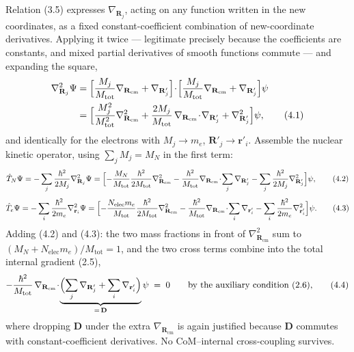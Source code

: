 \documentclass{article}
\begin{document}
Relation (3.5) expresses $\nabla_{\mathbf{R}_j}$, acting on any function written in the new coordinates, as a fixed constant-coefficient combination of new-coordinate derivatives. Applying it twice --- legitimate precisely because the coefficients are constants, and mixed partial derivatives of smooth functions commute --- and expanding the square,
\begin{align}
\nabla^2_{\mathbf{R}_j}\Psi
&=\Bigl[\frac{M_j}{M_{\mathrm{tot}}}\nabla_{\mathbf{R}_{\mathrm{cm}}}+\nabla_{\mathbf{R}'_j}\Bigr]\!\cdot\!\Bigl[\frac{M_j}{M_{\mathrm{tot}}}\nabla_{\mathbf{R}_{\mathrm{cm}}}+\nabla_{\mathbf{R}'_j}\Bigr]\psi \nonumber\\
&=\Bigl[\frac{M_j^2}{M_{\mathrm{tot}}^2}\nabla^2_{\mathbf{R}_{\mathrm{cm}}}
+\frac{2M_j}{M_{\mathrm{tot}}}\,\nabla_{\mathbf{R}_{\mathrm{cm}}}\!\cdot\!\nabla_{\mathbf{R}'_j}
+\nabla^2_{\mathbf{R}'_j}\Bigr]\psi , \tag{4.1}
\end{align}
and identically for the electrons with $M_j\to m_e$, $\mathbf{R}'_j\to\mathbf{r}'_i$. Assemble the nuclear kinetic operator, using $\sum_j M_j=M_N$ in the first term:
\begin{equation}
\hat T_N\Psi=-\sum_j\frac{\hbar^2}{2M_j}\nabla^2_{\mathbf{R}_j}\Psi
=\Bigl[-\frac{M_N}{M_{\mathrm{tot}}}\frac{\hbar^2}{2M_{\mathrm{tot}}}\nabla^2_{\mathbf{R}_{\mathrm{cm}}}
-\frac{\hbar^2}{M_{\mathrm{tot}}}\nabla_{\mathbf{R}_{\mathrm{cm}}}\!\cdot\!\sum_j\nabla_{\mathbf{R}'_j}
-\sum_j\frac{\hbar^2}{2M_j}\nabla^2_{\mathbf{R}'_j}\Bigr]\psi , \tag{4.2}
\end{equation}
\begin{equation}
\hat T_e\Psi=-\sum_i\frac{\hbar^2}{2m_e}\nabla^2_{\mathbf{r}_i}\Psi
=\Bigl[-\frac{N_{\mathrm{elec}}m_e}{M_{\mathrm{tot}}}\frac{\hbar^2}{2M_{\mathrm{tot}}}\nabla^2_{\mathbf{R}_{\mathrm{cm}}}
-\frac{\hbar^2}{M_{\mathrm{tot}}}\nabla_{\mathbf{R}_{\mathrm{cm}}}\!\cdot\!\sum_i\nabla_{\mathbf{r}'_i}
-\sum_i\frac{\hbar^2}{2m_e}\nabla^2_{\mathbf{r}'_i}\Bigr]\psi . \tag{4.3}
\end{equation}
Adding (4.2) and (4.3): the two mass fractions in front of $\nabla^2_{\mathbf{R}_{\mathrm{cm}}}$ sum to $(M_N+N_{\mathrm{elec}}m_e)/M_{\mathrm{tot}}=1$, and the two cross terms combine into the total internal gradient (2.5),
\begin{equation}
-\frac{\hbar^2}{M_{\mathrm{tot}}}\,\nabla_{\mathbf{R}_{\mathrm{cm}}}\!\cdot\!\underbrace{\Bigl(\sum_j\nabla_{\mathbf{R}'_j}+\sum_i\nabla_{\mathbf{r}'_i}\Bigr)}_{=\,\mathbf{D}}\psi \;=\; 0
\qquad\text{by the auxiliary condition (2.6),} \tag{4.4}
\end{equation}
where dropping $\mathbf{D}$ under the extra $\nabla_{\mathbf{R}_{\mathrm{cm}}}$ is again justified because $\mathbf{D}$ commutes with constant-coefficient derivatives. No CoM--internal cross-coupling survives.
\end{document}
